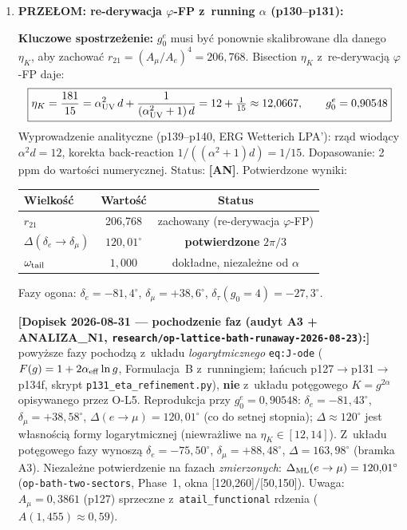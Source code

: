 \begin{enumerate}
  \item \textbf{PRZE\L{}OM: re-derywacja $\varphi$-FP z~running $\alpha$ (p130--p131):}

    \textbf{Kluczowe spostrzeżenie:} $g_0^e$ musi być ponownie
    skalibrowane dla danego $\eta_K$, aby zachować
    $r_{21} = (A_\mu/A_e)^4 = 206{,}768$.
    Bisection $\eta_K$ z~re-derywacj\k{a} $\varphi$-FP daje:
    \begin{equation}\label{eq:etaK-optimal}
      \boxed{\eta_K = \frac{181}{15} = \alpha_{\rm UV}^2\,d
        + \frac{1}{(\alpha_{\rm UV}^2+1)\,d}
        = 12 + \tfrac{1}{15} \approx 12{,}0667,
        \qquad g_0^e = 0{,}90548}
    \end{equation}
    Wyprowadzenie analityczne (p139--p140, ERG Wetterich LPA'):
    rz\k{a}d wiod\k{a}cy $\alpha^2 d = 12$, korekta back-reaction
    $1/((\alpha^2+1)d) = 1/15$. Dopasowanie: 2\,ppm do warto\'sci
    numerycznej. Status: \textbf{[AN]}.
    Potwierdzone wyniki:
    \begin{center}\small
    \begin{tabular}{lcc}
    \toprule
    \textbf{Wielko\'s\'c} & \textbf{Warto\'s\'c} & \textbf{Status} \\ \midrule
    $r_{21}$ & 206{,}768 & zachowany (re-derywacja $\varphi$-FP) \\
    $\Delta(\delta_e\to\delta_\mu)$ & $120{,}01^\circ$
      & \textbf{potwierdzone} $2\pi/3$ \\
    $\omega_{\rm tail}$ & $1{,}000$ & dok\l{}adne, niezale\.zne od $\alpha$ \\
    \bottomrule
    \end{tabular}
    \end{center}
    Fazy ogona:
    $\delta_e = -81{,}4^\circ$,
    $\delta_\mu = +38{,}6^\circ$,
    $\delta_\tau(g_0=4) = -27{,}3^\circ$.

    \textbf{[Dopisek 2026-08-31 --- pochodzenie faz (audyt A3 +
    ANALIZA\_N1, \texttt{research/op-lattice-bath-runaway-2026-08-23}):]}
    powy\.zsze fazy pochodz\k{a} z~uk\l{}adu \emph{logarytmicznego}
    \texttt{eq:J-ode} ($F(g)=1+2\alpha_{\rm eff}\ln g$, Formulacja~B
    z~runningiem; \l{}a\'ncuch p127$\to$p131$\to$p134f, skrypt
    \texttt{p131\_eta\_refinement.py}), \textbf{nie} z~uk\l{}adu
    pot\k{e}gowego $K=g^{2\alpha}$ opisywanego przez O-L5.
    Reprodukcja przy $g_0^e=0{,}90548$: $\delta_e=-81{,}43^\circ$,
    $\delta_\mu=+38{,}58^\circ$, $\Delta(e\to\mu)=120{,}01^\circ$
    (co do setnej stopnia); $\Delta\approx120^\circ$ jest
    w\l{}asno\'sci\k{a} formy logarytmicznej (niewra\.zliwe na
    $\eta_K\in[12,14]$). Z~uk\l{}adu pot\k{e}gowego fazy wynosz\k{a}
    $\delta_e=-75{,}50^\circ$, $\delta_\mu=+88{,}48^\circ$,
    $\Delta=163{,}98^\circ$ (bramka A3). Niezale\.zne potwierdzenie
    na fazach \emph{zmierzonych}: $\Delta_{\rm ML}(e\to\mu)=120{,}01^\circ$
    (\texttt{op-bath-two-sectors}, Phase~1, okna [120,260]/[50,150]).
    Uwaga: $A_\mu=0{,}3861$ (p127) sprzeczne
    z~\texttt{atail\_functional} rdzenia ($A(1{,}455)\approx0{,}59$).


\end{enumerate}

